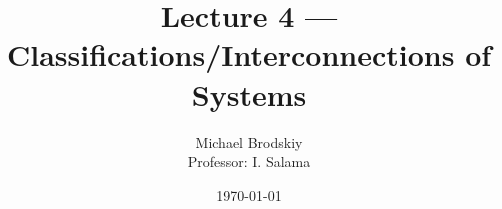 


\title{Lecture 4 — Classifications/Interconnections of Systems}
\date{\today}
\author{Michael Brodskiy\\ \small Professor: I. Salama}



\maketitle

